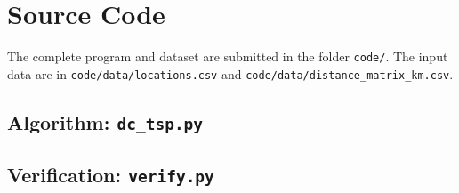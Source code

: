 \section{Source Code}\label{app:code}
The complete program and dataset are submitted in the folder \texttt{code/}. The input data are in
\texttt{code/data/locations.csv} and \texttt{code/data/distance\_matrix\_km.csv}.

\subsection{Algorithm: \texttt{dc\_tsp.py}}


\subsection{Verification: \texttt{verify.py}}


